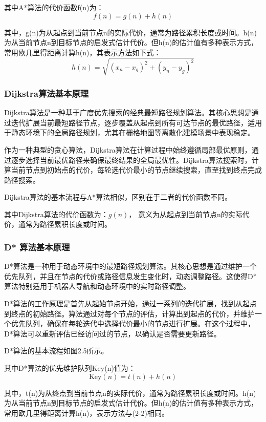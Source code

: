 \documentclass[lettersize,journal]{IEEEtran}
\begin{document}
其中A*算法的代价函数f(n)为：
\begin{equation}
f(n) = g(n) + h(n)
\end{equation}

其中，g(n)为从起点到当前节点n的实际代价，通常为路径累积长度或时间。h(n)为从当前节点n到目标节点的启发式估计代价。但h(n)的估计值有多种表示方式，常用欧几里得距离计算h(n)，其表示方法如下式：
\begin{equation}
h(n) = \sqrt{(x_n - x_g)^2 + (y_n - y_g)^2}
\end{equation}


\subsubsection{Dijkstra算法基本原理}
Dijkstra算法是一种基于广度优先搜索的经典最短路径规划算法。其核心思想是通过迭代扩展当前最短路径节点，逐步覆盖从起点到所有可达节点的最优路径，适用于静态环境下的全局路径规划，尤其在栅格地图等离散化建模场景中表现稳定。

作为一种典型的贪心算法，Dijkstra算法在计算过程中始终遵循局部最优原则，通过逐步选择当前最优路径来确保最终结果的全局最优性。Dijkstra算法搜索时，计算当前节点到初始点的代价，每轮选代价最小的节点继续搜索，直至找到终点完成路径搜索。

Dijkstra算法的基本流程与A*算法相似，区别在于二者的代价函数不同。

其中Dijkstra算法的代价函数为：$ g(n) $，
意义为从起点到当前节点n的实际代价，通常为路径累积长度或时间。


\subsubsection{D* 算法基本原理}
D*算法是一种用于动态环境中的最短路径规划算法。其核心思想是通过维护一个优先队列，并且在节点的代价或路径信息发生变化时，动态调整路径。这使得D*算法特别适用于机器人导航和动态环境中的实时路径调整。

D*算法的工作原理是首先从起始节点开始，通过一系列的迭代扩展，找到从起点到终点的初始路径。算法通过对每个节点的评估，计算出到起点的代价，并维护一个优先队列，确保在每轮迭代中选择代价最小的节点进行扩展。在这个过程中，D*算法可以重新评估已经访问过的节点，以确认是否需要更新路径。

D*算法的基本流程如图2.5所示。

其中D*算法的优先维护队列Key(n)值为：
\begin{equation}
\text{Key}(n) = t(n) + h(n)
\end{equation}

其中，t(n)为从终点到当前节点n的实际代价，通常为路径累积长度或时间。h(n)为从当前节点n到目标节点的启发式估计代价。但h(n)的估计值有多种表示方式，常用欧几里得距离计算h(n)，表示方法与(2-2)相同。
\end{document}
